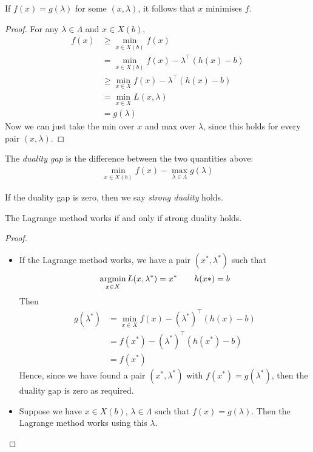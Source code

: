 \documentclass{../template/note}
\begin{document}
    \begin{remark*}
        If $f(x) = g(\lambda)$ for some $(x, \lambda)$, it follows that $x$ minimises $f$.
    \end{remark*}
    
    \begin{proof}
        For any $\lambda \in \Lambda$ and $x \in X(b)$,
        \begin{align*}
            f(x) &\geq \min_{x \in X(b)} f(x) \\
            &= \min_{x \in X(b)} f(x) - \lambda^\intercal (h(x)-b) \\
            &\geq \min_{x \in X} f(x) - \lambda^\intercal (h(x)-b) \\
            &= \min_{x \in X} L(x, \lambda) \\
            &= g(\lambda)
        \end{align*}
        Now we can just take the min over $x$ and max over $\lambda$, since this holds for every pair $(x, \lambda)$.
    \end{proof}
    
    \begin{definition}
        The \emph{duality gap} is the difference between the two quantities above:
        \begin{align*}
            \min_{x \in X(b)} f(x) - \max_{\lambda \in \Lambda} g(\lambda)
        \end{align*}       
    \end{definition}
    
    If the duality gap is zero, then we say \emph{strong duality} holds.

    \begin{theorem}
        The Lagrange method works if and only if strong duality holds.
    \end{theorem}
    
    \begin{proof}
        \begin{itemize}
            \item[$\implies$] If the Lagrange method works, we have a pair $(x^*, \lambda^*)$ such that
            \begin{align*}
                \operatorname*{arg min}_{x \in X} L(x, \lambda^*) = x^* \qquad h(x*) = b
            \end{align*}
            Then
            \begin{align*}
                g(\lambda^*) &= \min_{x \in X} f(x) - (\lambda^*)^\intercal (h(x)-b) \\
                &= f(x^*) - (\lambda^*)^\intercal (h(x^*)-b) \\
                &= f(x^*)
            \end{align*}
            Hence, since we have found a pair $(x^*, \lambda^*)$ with $f(x^*) = g(\lambda^*)$, then the duality gap is zero as required.
            \item[$\impliedby$] Suppose we have $x \in X(b)$, $\lambda \in \Lambda$ such that $f(x) = g(\lambda)$. Then the Lagrange method works using this $\lambda$.            
        \end{itemize}
    \end{proof}
    
\end{document}
